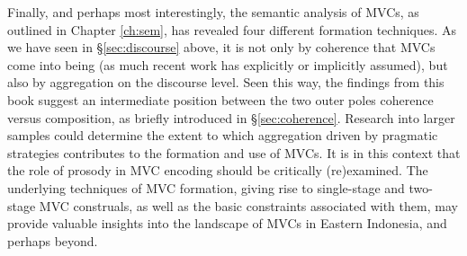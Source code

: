 Finally, and perhaps most interestingly, the semantic analysis of MVCs, as outlined in Chapter \ref{ch:sem}, has revealed four different formation techniques. As we have seen in §\ref{sec:discourse} above, it is not only by coherence that MVCs come into being (as much recent work has explicitly or implicitly assumed), but also by aggregation on the discourse level. Seen this way, the findings from this book suggest an intermediate position between the two outer poles coherence versus composition, as briefly introduced in §\ref{sec:coherence}. Research into larger samples could determine the extent to which aggregation driven by pragmatic strategies contributes to the formation and use of MVCs. It is in this context that the role of prosody in MVC encoding should be critically (re)examined. The underlying techniques of MVC formation, giving rise to single-stage and two-stage MVC construals, as well as the basic constraints associated with them, may provide valuable insights into the landscape of MVCs in Eastern Indonesia, and perhaps beyond.